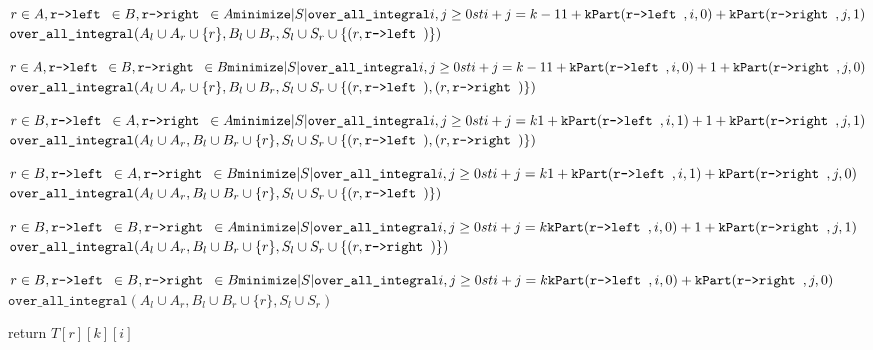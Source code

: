\documentclass[11pt]{article}
\begin{document}
\begin{indentmore}
\begin{indentmore}
          $r \in A, \texttt{r->left } \in B, \texttt{r->right } \in A\\
              \texttt{minimize} |S| \texttt{over\_all\_integral} i,j \geq 0 st i+j = k-1\\
                1 + \mathtt{kPart}(\texttt{r->left },i,0) +     \mathtt{kPart}(\texttt{r->right },j,1)$\\
                $\texttt{over\_all\_integral} (A_l \cup A_r \cup \{r\},B_l \cup B_r,S_l \cup S_r \cup \{(r, \texttt{r->left })\})$

          $r \in A, \texttt{r->left } \in B, \texttt{r->right } \in B\\
              \texttt{minimize} |S| \texttt{over\_all\_integral} i,j \geq 0 st i+j = k-1\\
                1 + \mathtt{kPart}(\texttt{r->left },i,0) + 1 + \mathtt{kPart}(\texttt{r->right },j,0)$\\
                $\texttt{over\_all\_integral} (A_l \cup A_r \cup \{r\},B_l \cup B_r,S_l \cup S_r \cup \{(r, \texttt{r->left }),(r, \texttt{r->right })\})$

          $r \in B, \texttt{r->left } \in A, \texttt{r->right } \in A\\
              \texttt{minimize} |S| \texttt{over\_all\_integral} i,j \geq 0 st i+j = k\\
                1 + \mathtt{kPart}(\texttt{r->left },i,1) + 1 + \mathtt{kPart}(\texttt{r->right },j,1)$\\
                $\texttt{over\_all\_integral} (A_l \cup A_r,B_l \cup B_r \cup \{r\},S_l \cup S_r \cup \{(r, \texttt{r->left }),(r, \texttt{r->right })\})$

          $r \in B, \texttt{r->left } \in A, \texttt{r->right } \in B\\
              \texttt{minimize} |S| \texttt{over\_all\_integral} i,j \geq 0 st i+j = k\\
                1 + \mathtt{kPart}(\texttt{r->left },i,1) +     \mathtt{kPart}(\texttt{r->right },j,0)$\\
                $\texttt{over\_all\_integral} (A_l \cup A_r,B_l \cup B_r \cup \{r\},S_l \cup S_r \cup \{(r, \texttt{r->left })\})$

          $r \in B, \texttt{r->left } \in B, \texttt{r->right } \in A\\
              \texttt{minimize} |S| \texttt{over\_all\_integral} i,j \geq 0 st i+j = k\\
                    \mathtt{kPart}(\texttt{r->left },i,0) + 1 + \mathtt{kPart}(\texttt{r->right },j,1)$\\
                $\texttt{over\_all\_integral} (A_l \cup A_r,B_l \cup B_r \cup \{r\},S_l \cup S_r \cup \{(r, \texttt{r->right })\})$

          $r \in B, \texttt{r->left } \in B, \texttt{r->right } \in B\\
              \texttt{minimize} |S| \texttt{over\_all\_integral} i,j \geq 0 st i+j = k\\
                    \mathtt{kPart}(\texttt{r->left },i,0) +     \mathtt{kPart}(\texttt{r->right },j,0)$\\
                $\texttt{over\_all\_integral} (A_l \cup A_r,B_l \cup B_r \cup \{r\},S_l \cup S_r)$
        \end{indentmore}


   return $T[r][k][i]$
\end{indentmore}
\end{document}
